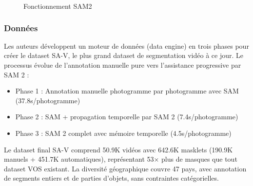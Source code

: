 \begin{figure}[H]
    \centering
   
    \begin{subfigure}{0.20\textwidth}
        \label{fig:ch2_sam2_pvs}
    \end{subfigure}
    \hfill
    \begin{subfigure}{0.25\textwidth}
        \label{fig:ch2_sam2_model}
    \end{subfigure}
    \hfill
    \begin{subfigure}{0.20\textwidth}
        \label{fig:ch2_sam2_data}
    \end{subfigure}
    
    \caption{Fonctionnement SAM2 \cite{ravi_sam_2024}}
    \label{fig:ch2_sam2_fonctionnement}
\end{figure}

\subsubsection{Données}
Les auteurs développent un moteur de données (data engine) en trois phases pour créer le dataset SA-V, le plus grand dataset de segmentation vidéo à ce jour. Le processus évolue de l'annotation manuelle pure vers l'assistance progressive par SAM 2 :
\begin{itemize}
    \item Phase 1 : Annotation manuelle photogramme par photogramme avec SAM (37.8s/photogramme)
    \item Phase 2 : SAM + propagation temporelle par SAM 2 (7.4s/photogramme)
    \item Phase 3 : SAM 2 complet avec mémoire temporelle (4.5s/photogramme)
\end{itemize}

Le dataset final SA-V comprend 50.9K vidéos avec 642.6K masklets (190.9K manuels + 451.7K automatiques), représentant 53× plus de masques que tout dataset VOS existant. La diversité géographique couvre 47 pays, avec annotation de segments entiers et de parties d'objets, sans contraintes catégorielles.

